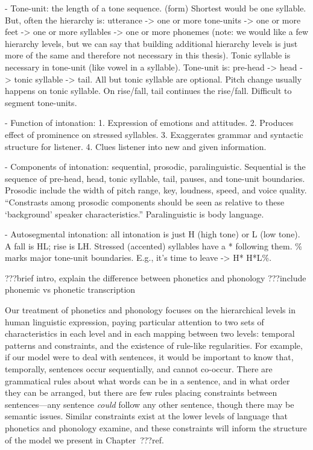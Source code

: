 - Tone-unit: the length of a tone sequence. (form)
  Shortest would be one syllable. But, often the hierarchy is:
  utterance -> one or more tone-units -> one or more feet ->
  one or more syllables -> one or more phonemes
  (note: we would like a few hierarchy levels, but we can say
  that building additional hierarchy levels is just more of
  the same and therefore not necessary in this thesis).
  Tonic syllable is necessary in tone-unit (like vowel in a syllable).
  Tone-unit is: pre-head -> head -> tonic syllable -> tail.
  All but tonic syllable are optional.
  Pitch change usually happens on tonic syllable.
  On rise/fall, tail continues the rise/fall.
  Difficult to segment tone-units.

- Function of intonation: 1. Expression of emotions and attitudes.
  2. Produces effect of prominence on stressed syllables.
  3. Exaggerates grammar and syntactic structure for listener.
  4. Clues listener into new and given information.

- Components of intonation: sequential, prosodic, paralinguistic.
  Sequential is the sequence of pre-head, head, tonic syllable, tail,
  pauses, and tone-unit boundaries. Prosodic include the
  width of pitch range, key, loudness, speed, and voice quality.
  ``Constrasts among prosodic components should be seen as relative
  to these `background' speaker characteristics.''
  Paralinguistic is body language.

- Autosegmental intonation: all intonation is just
  H (high tone) or L (low tone). A fall is HL; rise is LH.
  Stressed (accented) syllables have a * following them.
  \% marks major tone-unit boundaries.
  E.g., it's time to leave -> H* H*L\%.

???brief intro, explain the difference
between phonetics and phonology
???include phonemic vs phonetic transcription

Our treatment of phonetics and phonology
focuses on the hierarchical levels
in human linguistic expression,
paying particular attention to two
sets of characteristics in each level
and in each mapping between two levels:
temporal patterns and constraints,
and the existence of rule-like regularities.
For example,
if our model were to deal with sentences,
it would be important to know that,
temporally, sentences occur sequentially,
and cannot co-occur.
There are grammatical rules
about what words can be in a sentence,
and in what order they can be arranged,
but there are few rules placing constraints
between sentences---any sentence \textit{could}
follow any other sentence,
though there may be semantic issues.
Similar constraints exist at
the lower levels of language that
phonetics and phonology examine,
and these constraints will
inform the structure of the model
we present in Chapter~???ref.

